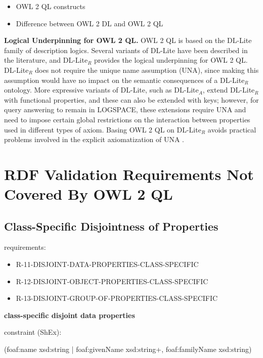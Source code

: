 \documentclass{llncs}
\begin{document}
\begin{itemize}
  \item OWL 2 QL constructs
	\item Difference between OWL 2 DL and OWL 2 QL
\end{itemize}

\textbf{Logical Underpinning for OWL 2 QL.}
OWL 2 QL is based on the DL-Lite family of description logics. Several variants of DL-Lite have been described in the literature, and DL-Lite$_R$ provides the logical underpinning for OWL 2 QL. DL-Lite$_R$ does not require the unique name assumption (UNA), since making this assumption would have no impact on the semantic consequences of a DL-Lite$_R$ ontology. More expressive variants of DL-Lite, such as DL-Lite$_A$, extend DL-Lite$_R$ with functional properties, and these can also be extended with keys; however, for query answering to remain in LOGSPACE, these extensions require UNA and need to impose certain global restrictions on the interaction between properties used in different types of axiom. Basing OWL 2 QL on DL-Lite$_R$ avoids practical problems involved in the explicit axiomatization of UNA \cite{owl2profiles2008}. 

\section{RDF Validation Requirements Not Covered By OWL 2 QL}

\subsection{Class-Specific Disjointness of Properties}

requirements:

\begin{itemize}
	\item R-11-DISJOINT-DATA-PROPERTIES-CLASS-SPECIFIC
  \item R-12-DISJOINT-OBJECT-PROPERTIES-CLASS-SPECIFIC
  \item R-13-DISJOINT-GROUP-OF-PROPERTIES-CLASS-SPECIFIC
\end{itemize}

\textbf{class-specific disjoint data properties}

constraint (ShEx):

\begin{ex}
(foaf:name xsd:string  | foaf:givenName xsd:string+, foaf:familyName xsd:string)
\end{ex}
\end{document}
